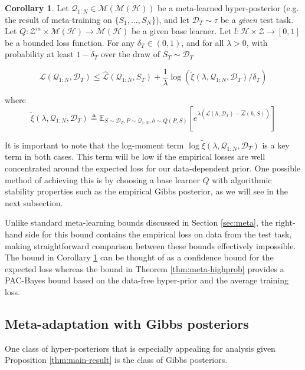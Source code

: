 \documentclass{article}
\theoremstyle{definition}
\newtheorem{corollary}[theorem]{Corollary}
\newcommand{\Expect}[2]{\mathbb{E}_{#1}\left [#2 \right ]}
\begin{document}
\begin{corollary} \label{thm:corollary-base}
	Let $\mathcal{Q}_{1:N}\in \mathcal{M}(\mathcal{M}(\mathcal{H}))$ be a meta-learned hyper-posterior (e.g. the result of meta-training on $\{S_1,...,S_N\}$), and let $\mathcal{D}_T\sim \tau$ be a \emph{given} test task. Let $Q: \mathcal{Z}^m\times\mathcal{M}(\mathcal{H})\rightarrow \mathcal{M}(\mathcal{H})$ be a given base learner. Let $l: \mathcal{H}\times \mathcal{Z}\rightarrow [0, 1]$ be a bounded loss function.
	For any $\delta_T \in (0,1)$, and for all $\lambda>0$, with probability at least $1-\delta_T$ over the draw of $S_T\sim \mathcal{D}_T$
	
	$$\mathcal{L}(\mathcal{Q}_{1:N}, \mathcal{D}_T) \leq \hat{\mathcal{L}}(\mathcal{Q}_{1:N}, S_T)
	+\frac{1}{\lambda}\log\left (\tilde{\xi}(\lambda,\mathcal{Q}_{1:N},\mathcal{D}_T)/\delta_T\right )$$
	
	where 
	$$\tilde{\xi}(\lambda,\mathcal{Q}_{1:N},\mathcal{D}_T)\triangleq \Expect{S\sim \mathcal{D}_T, P\sim \mathcal{Q}_{1:N}, h\sim Q(P,S)}{e^{\lambda\left (\mathcal{L}(h, \mathcal{D}_T)-\hat{\mathcal{L}}(h, S)\right )}}$$
\end{corollary}

It is important to note that the log-moment term $\log\tilde{\xi}(\lambda,\mathcal{Q}_{1:N},\mathcal{D}_T)$ is a key term in both cases. This term will be low if the empirical losses are well concentrated around the expected loss for our data-dependent prior. One possible method of achieving this is by choosing a base learner $Q$ with algorithmic stability properties such as the empirical Gibbs posterior, as we will see in the next subsection.

Unlike standard meta-learning bounds discussed in Section \ref{sec:meta}, the right-hand side for this bound contains the empirical loss on data from the test task, making straightforward comparison between these bounds effectively impossible. The bound in Corollary \ref{thm:corollary-base} can be thought of as a confidence bound for the expected loss whereas the bound in Theorem \ref{thm:meta-highprob} provides a PAC-Bayes bound based on the data-free hyper-prior and the average training loss.

\subsection{Meta-adaptation with Gibbs posteriors} \label{sec:adapt-gibbs}

One class of hyper-posteriors that is especially appealing for analysis given Proposition \ref{thm:main-result} is the class of Gibbs posteriors.
\end{document}
